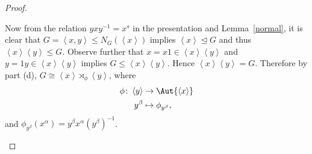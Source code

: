 \documentclass[10pt]{amsart}
\begin{document}
\begin{thm}
\begin{proof}
\begin{enumerate}[(a)]
      Now from the relation $yxy^{-1} = x^s$ in the presentation and Lemma~\ref{normal}, it is clear that $G = \left<x, y\right> \leq N_G(\left<x\right>)$ implies $\left<x\right> \unlhd G$ and thus $\left<x\right>\left<y\right> \leq G$.
      Observe further that $x = x1 \in \left<x\right>\left<y\right>$ and $y = 1y \in \left<x\right>\left<y\right>$ implies $G \leq \left<x\right>\left<y\right>$.
      Hence $\left<x\right>\left<y\right> = G$.
      Therefore by part (d), $G \cong \left<x\right> \rtimes_{\phi} \left<y\right>$, where 
      \begin{align*}
        \phi \colon \left<y\right> &\rightarrow \Aut{\left<x\right>}\\
        y^\beta &\mapsto \phi_{y^\beta},
      \end{align*} 
      and $\phi_{y^\beta}(x^\alpha) = y^\beta x^\alpha (y^\beta)^{-1}$.
    \end{enumerate}
  \end{proof}
\end{thm}
\end{document}
